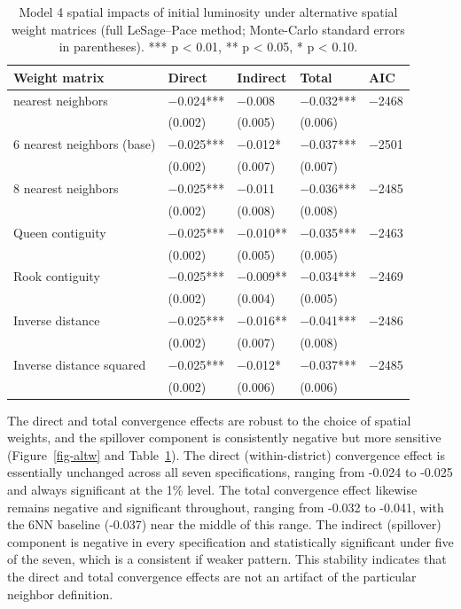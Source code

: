 \documentclass[
  a4paper, 
  twoside,
  final
]{article}
\begin{document}
\begin{longtable}[]{@{}lllll@{}}

\caption{\label{tbl-altw}Model 4 spatial impacts of initial luminosity
under alternative spatial weight matrices (full LeSage--Pace method;
Monte-Carlo standard errors in parentheses). *** p \textless{} 0.01, **
p \textless{} 0.05, * p \textless{} 0.10.}

\tabularnewline

\toprule\noalign{}
Weight matrix & Direct & Indirect & Total & AIC \\
\midrule\noalign{}
\endhead
\bottomrule\noalign{}
\endlastfoot
4 nearest neighbors & −0.024*** & −0.008 & −0.032*** & −2468 \\
& (0.002) & (0.005) & (0.006) & \\
6 nearest neighbors (base) & −0.025*** & −0.012* & −0.037*** & −2501 \\
& (0.002) & (0.007) & (0.007) & \\
8 nearest neighbors & −0.025*** & −0.011 & −0.036*** & −2485 \\
& (0.002) & (0.008) & (0.008) & \\
Queen contiguity & −0.025*** & −0.010** & −0.035*** & −2463 \\
& (0.002) & (0.005) & (0.005) & \\
Rook contiguity & −0.025*** & −0.009** & −0.034*** & −2469 \\
& (0.002) & (0.004) & (0.005) & \\
Inverse distance & −0.025*** & −0.016** & −0.041*** & −2486 \\
& (0.002) & (0.007) & (0.008) & \\
Inverse distance squared & −0.025*** & −0.012* & −0.037*** & −2485 \\
& (0.002) & (0.006) & (0.006) & \\

\end{longtable}

\endgroup

The direct and total convergence effects are robust to the choice of
spatial weights, and the spillover component is consistently negative
but more sensitive (Figure~\ref{fig-altw} and Table~\ref{tbl-altw}). The
direct (within-district) convergence effect is essentially unchanged
across all seven specifications, ranging from -0.024 to -0.025 and
always significant at the 1\% level. The total convergence effect
likewise remains negative and significant throughout, ranging from
-0.032 to -0.041, with the 6NN baseline (-0.037) near the middle of this
range. The indirect (spillover) component is negative in every
specification and statistically significant under five of the seven,
which is a consistent if weaker pattern. This stability indicates that
the direct and total convergence effects are not an artifact of the
particular neighbor definition.
\end{document}
